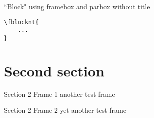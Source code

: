 \begin{frame}[fragile]{``Block" using framebox and parbox without title}
    \begin{verbatim}
\fblocknt{
    ...
}
    \end{verbatim}

    \end{frame}


\section{Second section}


\begin{frame}{Section 2 Frame 1}
    another test frame
\end{frame}


\begin{frame}{Section 2 Frame 2}
    yet another test frame
\end{frame}
